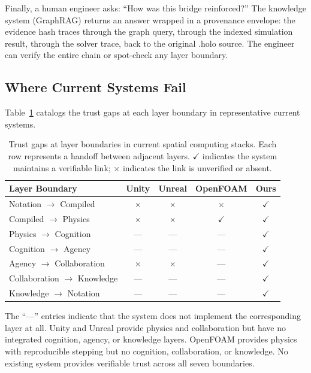 \documentclass[sigchi-a]{acmart}
\begin{document}
Finally, a human engineer asks: ``How was this bridge reinforced?'' The
knowledge system (GraphRAG) returns an answer wrapped in a provenance
envelope: the evidence hash traces through the graph query, through the
indexed simulation result, through the solver trace, back to the original
.holo source. The engineer can verify the entire chain or spot-check any
layer boundary.

\subsection{Where Current Systems Fail}

Table~\ref{tab:trust-gaps} catalogs the trust gaps at each layer boundary in
representative current systems.

\begin{table}[t]
  \caption{Trust gaps at layer boundaries in current spatial computing stacks.
    Each row represents a handoff between adjacent layers. $\checkmark$ indicates
    the system maintains a verifiable link; $\times$ indicates the link is
    unverified or absent.}
  \label{tab:trust-gaps}
  \small
  \begin{tabular}{lcccc}
    \toprule
    \textbf{Layer Boundary} & \textbf{Unity} & \textbf{Unreal} & \textbf{OpenFOAM} & \textbf{Ours} \\
    \midrule
    Notation $\to$ Compiled    & $\times$ & $\times$ & $\times$ & $\checkmark$ \\
    Compiled $\to$ Physics     & $\times$ & $\times$ & $\checkmark$ & $\checkmark$ \\
    Physics $\to$ Cognition    & --- & --- & --- & $\checkmark$ \\
    Cognition $\to$ Agency     & --- & --- & --- & $\checkmark$ \\
    Agency $\to$ Collaboration & $\times$ & $\times$ & --- & $\checkmark$ \\
    Collaboration $\to$ Knowledge & --- & --- & --- & $\checkmark$ \\
    Knowledge $\to$ Notation   & --- & --- & --- & $\checkmark$ \\
    \bottomrule
  \end{tabular}
\end{table}

The ``---'' entries indicate that the system does not implement the
corresponding layer at all. Unity and Unreal provide physics and
collaboration but have no integrated cognition, agency, or knowledge layers.
OpenFOAM provides physics with reproducible stepping but no cognition,
collaboration, or knowledge. No existing system provides verifiable trust
across all seven boundaries.
\end{document}
